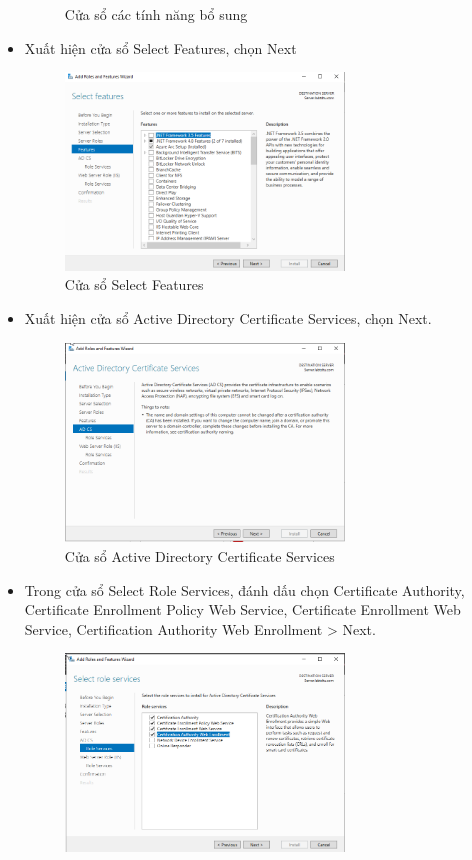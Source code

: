 \documentclass[13pt]{report}
\begin{document}
\begin{itemize}
\begin{figure}[htp]
			\caption{Cửa sổ các tính năng bổ sung}
		\end{figure}
		\newpage
		\item Xuất hiện cửa sổ Select Features, chọn Next
		\begin{figure}[htp]
			\centering
			\includegraphics[width=0.7\textwidth]{image/Gui/ADCS/7.png}
			\caption{Cửa sổ Select Features}
		\end{figure}
		\item Xuất hiện cửa sổ Active Directory Certificate Services, chọn Next.
		\begin{figure}[htp]
			\centering
			\includegraphics[width=0.7\textwidth]{image/Gui/ADCS/8.png}
			\caption{Cửa sổ Active Directory Certificate Services}
		\end{figure}
		\newpage
		\item Trong cửa sổ Select Role Services, đánh dấu chọn Certificate Authority, Certificate Enrollment Policy Web Service, Certificate Enrollment Web Service, Certification Authority Web Enrollment > Next.
		\begin{figure}[htp]
			\centering
			\includegraphics[width=0.7\textwidth]{image/Gui/ADCS/9.png}

\end{figure}
\end{itemize}
\end{document}

